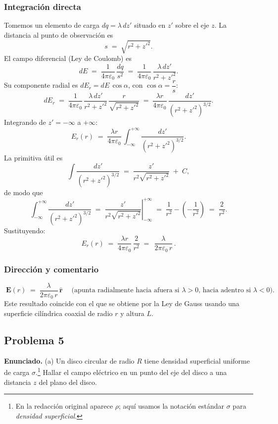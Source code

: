 \documentclass{article}
\begin{document}
\subsubsection*{Integración directa}
Tomemos un elemento de carga $dq=\lambda\,dz'$ situado en $z'$ sobre el eje $z$. La distancia al punto de observación es
\[
s \;=\; \sqrt{r^2 + z'^2}.
\]
El campo diferencial (Ley de Coulomb) es
\[
dE \;=\; \frac{1}{4\pi\varepsilon_0}\,\frac{dq}{s^2}
\;=\; \frac{1}{4\pi\varepsilon_0}\,\frac{\lambda\,dz'}{r^2+z'^2}.
\]
Su componente radial es $dE_r = dE\,\cos\alpha$, con $\cos\alpha = \dfrac{r}{s}$:
\[
dE_r \;=\; \frac{1}{4\pi\varepsilon_0}\,\frac{\lambda\,dz'}{r^2+z'^2}\,\frac{r}{\sqrt{r^2+z'^2}}
\;=\; \frac{\lambda r}{4\pi\varepsilon_0}\,\frac{dz'}{(r^2+z'^2)^{3/2}}.
\]
Integrando de $z'=-\infty$ a $+\infty$:
\[
E_r(r) \;=\; \frac{\lambda r}{4\pi\varepsilon_0}\,\int_{-\infty}^{+\infty}\frac{dz'}{(r^2+z'^2)^{3/2}}.
\]
La primitiva útil es
\[
\int \frac{dz'}{(r^2+z'^2)^{3/2}} \;=\; \frac{z'}{r^2\sqrt{r^2+z'^2}} \;+\; C,
\]
de modo que
\[
\int_{-\infty}^{+\infty}\frac{dz'}{(r^2+z'^2)^{3/2}}
\;=\;
\left.\frac{z'}{r^2\sqrt{r^2+z'^2}}\right|_{-\infty}^{+\infty}
\;=\; \frac{1}{r^2} - \left(-\frac{1}{r^2}\right)
\;=\; \frac{2}{r^2}.
\]
Sustituyendo:
\[
E_r(r) \;=\; \frac{\lambda r}{4\pi\varepsilon_0}\,\frac{2}{r^2}
\;=\; \boxed{\,\frac{\lambda}{2\pi\varepsilon_0\,r}\,}.
\]

\subsubsection*{Dirección y comentario}
\[
\boxed{\;\mathbf{E}(r)\;=\;\frac{\lambda}{2\pi\varepsilon_0\,r}\,\hat{\mathbf r}\;}
\quad\text{(apunta radialmente hacia afuera si $\lambda>0$, hacia adentro si $\lambda<0$).}
\]
Este resultado coincide con el que se obtiene por la Ley de Gauss usando una superficie cilíndrica coaxial de radio $r$ y altura $L$.

\subsection{Problema 5} \vspace{0.5cm}

\textbf{Enunciado.} 
(a) Un disco circular de radio $R$ tiene densidad superficial uniforme de carga $\sigma$.\footnote{En la redacción original aparece $\rho$; aquí usamos la notación estándar $\sigma$ para \emph{densidad superficial}.} Hallar el campo eléctrico en un punto del eje del disco a una distancia $z$ del plano del disco. 
\end{document}
